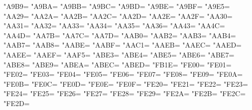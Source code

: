 \XeTeXcharclass"A9B9=\KclassCM
\XeTeXcharclass"A9BA=\KclassCM
\XeTeXcharclass"A9BB=\KclassCM
\XeTeXcharclass"A9BC=\KclassCM
\XeTeXcharclass"A9BD=\KclassCM
\XeTeXcharclass"A9BE=\KclassCM
\XeTeXcharclass"A9BF=\KclassCM
\XeTeXcharclass"A9E5=\KclassCM
\XeTeXcharclass"AA29=\KclassCM
\XeTeXcharclass"AA2A=\KclassCM
\XeTeXcharclass"AA2B=\KclassCM
\XeTeXcharclass"AA2C=\KclassCM
\XeTeXcharclass"AA2D=\KclassCM
\XeTeXcharclass"AA2E=\KclassCM
\XeTeXcharclass"AA2F=\KclassCM
\XeTeXcharclass"AA30=\KclassCM
\XeTeXcharclass"AA31=\KclassCM
\XeTeXcharclass"AA32=\KclassCM
\XeTeXcharclass"AA33=\KclassCM
\XeTeXcharclass"AA34=\KclassCM
\XeTeXcharclass"AA35=\KclassCM
\XeTeXcharclass"AA36=\KclassCM
\XeTeXcharclass"AA43=\KclassCM
\XeTeXcharclass"AA4C=\KclassCM
\XeTeXcharclass"AA4D=\KclassCM
\XeTeXcharclass"AA7B=\KclassCM
\XeTeXcharclass"AA7C=\KclassCM
\XeTeXcharclass"AA7D=\KclassCM
\XeTeXcharclass"AAB0=\KclassCM
\XeTeXcharclass"AAB2=\KclassCM
\XeTeXcharclass"AAB3=\KclassCM
\XeTeXcharclass"AAB4=\KclassCM
\XeTeXcharclass"AAB7=\KclassCM
\XeTeXcharclass"AAB8=\KclassCM
\XeTeXcharclass"AABE=\KclassCM
\XeTeXcharclass"AABF=\KclassCM
\XeTeXcharclass"AAC1=\KclassCM
\XeTeXcharclass"AAEB=\KclassCM
\XeTeXcharclass"AAEC=\KclassCM
\XeTeXcharclass"AAED=\KclassCM
\XeTeXcharclass"AAEE=\KclassCM
\XeTeXcharclass"AAEF=\KclassCM
\XeTeXcharclass"AAF5=\KclassCM
\XeTeXcharclass"ABE3=\KclassCM
\XeTeXcharclass"ABE4=\KclassCM
\XeTeXcharclass"ABE5=\KclassCM
\XeTeXcharclass"ABE6=\KclassCM
\XeTeXcharclass"ABE7=\KclassCM
\XeTeXcharclass"ABE8=\KclassCM
\XeTeXcharclass"ABE9=\KclassCM
\XeTeXcharclass"ABEA=\KclassCM
\XeTeXcharclass"ABEC=\KclassCM
\XeTeXcharclass"ABED=\KclassCM
\XeTeXcharclass"FB1E=\KclassCM
\XeTeXcharclass"FE00=\KclassCM
\XeTeXcharclass"FE01=\KclassCM
\XeTeXcharclass"FE02=\KclassCM
\XeTeXcharclass"FE03=\KclassCM
\XeTeXcharclass"FE04=\KclassCM
\XeTeXcharclass"FE05=\KclassCM
\XeTeXcharclass"FE06=\KclassCM
\XeTeXcharclass"FE07=\KclassCM
\XeTeXcharclass"FE08=\KclassCM
\XeTeXcharclass"FE09=\KclassCM
\XeTeXcharclass"FE0A=\KclassCM
\XeTeXcharclass"FE0B=\KclassCM
\XeTeXcharclass"FE0C=\KclassCM
\XeTeXcharclass"FE0D=\KclassCM
\XeTeXcharclass"FE0E=\KclassCM
\XeTeXcharclass"FE0F=\KclassCM
\XeTeXcharclass"FE20=\KclassCM
\XeTeXcharclass"FE21=\KclassCM
\XeTeXcharclass"FE22=\KclassCM
\XeTeXcharclass"FE23=\KclassCM
\XeTeXcharclass"FE24=\KclassCM
\XeTeXcharclass"FE25=\KclassCM
\XeTeXcharclass"FE26=\KclassCM
\XeTeXcharclass"FE27=\KclassCM
\XeTeXcharclass"FE28=\KclassCM
\XeTeXcharclass"FE29=\KclassCM
\XeTeXcharclass"FE2A=\KclassCM
\XeTeXcharclass"FE2B=\KclassCM
\XeTeXcharclass"FE2C=\KclassCM
\XeTeXcharclass"FE2D=\KclassCM
